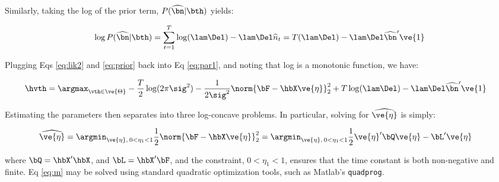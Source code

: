 \documentclass[12pt]{article}
\newcommand{\hC}{\widehat{C}}
\newcommand{\hn}{\widehat{n}}
\newcommand{\hnm}{\widehat{\bn}}
\newcommand{\hCm}{\widehat{\bC}}
\begin{document}
\noindent Similarly, taking the log of the prior term, $P(\hnm | \bth )$ yields:

\begin{align} \label{eq:prior}
\log P(\hnm | \bth) =  \sum _{t=1}^T \log(\lam \Del)  -\lam \Del \hn_t =T (\lam \Del) - \lam \Del \hnm' \ve{1} 
\end{align}

\noindent Plugging Eqs \eqref{eq:lik2} and \eqref{eq:prior} back into Eq \eqref{eq:par1}, and noting that log is a monotonic function, we have:



\begin{align} 
\hvth &=\argmax_{\vth \in \ve{\Theta}} - \frac{T}{2} \log (2\pi\sig^2) - \frac{1}{2\sig^2} \norm{\bF - \hbX \ve{\eta}}_2^2 + T \log (\lam \Del) - \lam \Del \hnm' \ve{1} \label{eq:par} 
\end{align}

\noindent %
Estimating the parameters then separates into three log-concave problems.  In particular, solving for $\widehat{\ve{\eta}}$ is simply:

\begin{align} 
\widehat{\ve{\eta}} &= \argmin_{\ve{\eta},\: 0< \eta_1<1} \frac{1}{2} \norm{\bF - \hbX \ve{\eta}}_2^2 
=  \argmin_{\ve{\eta},\: 0< \eta_1<1} \frac{1}{2} \ve{\eta}' \bQ  \ve{\eta} - \bL'  \ve{\eta} \label{eq:m} 
\end{align}

\noindent where $\bQ=\hbX' \hbX$, and $\bL=\hbX' \bF$, and the constraint, $0<\eta_1<1$, ensures that the time constant is both non-negative and finite.  Eq \eqref{eq:m} may be solved using standard quadratic optimization tools, such as Matlab's \texttt{quadprog}.  
\end{document}
